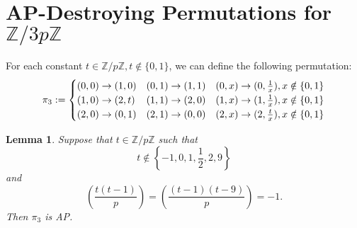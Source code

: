\documentclass[12pt]{amsart}
\newtheorem{lemma}[thm]{Lemma}
\theoremstyle{definition}
\theoremstyle{remark}
\newcommand{\Z}{\mathbb Z}
\begin{document}
\section{AP-Destroying Permutations for $\Z/3p\Z$}
For each constant $t\in \Z/p\Z, t\notin\{0, 1\}$, we can define the following permutation:
\[\pi_3 :=  \setlength{\arraycolsep}{0pt}
\renewcommand{\arraystretch}{1.2}
\left\{\begin{array}{l @{\quad} l @{\quad}l}
       (0,  0)\to (1, 0) & (0, 1)\to (1, 1) & (0, x)\to (0, \frac{1}{x}), x\notin \{0, 1\}
       \\ (1,  0)\to (2, t) & (1, 1)\to (2, 0) & (1, x)\to (1, \frac{1}{x}), x\notin \{0, 1\}
       \\ (2,  0)\to (0, 1) & (2, 1)\to (0, 0) & (2, x)\to (2, \frac{t}{x}), x\notin \{0, 1\}
\end{array}\right.\]
\begin{lemma}
Suppose that $t\in \Z/p\Z$ such that
\[t\notin \left\{-1, 0, 1, \frac{1}{2}, 2, 9\right\}\]
and 
\[(\frac{t(t-1)}{p})=(\frac{(t-1)(t-9)}{p})=-1.\]
Then $\pi_3$ is AP. 
\end{lemma}
\end{document}
